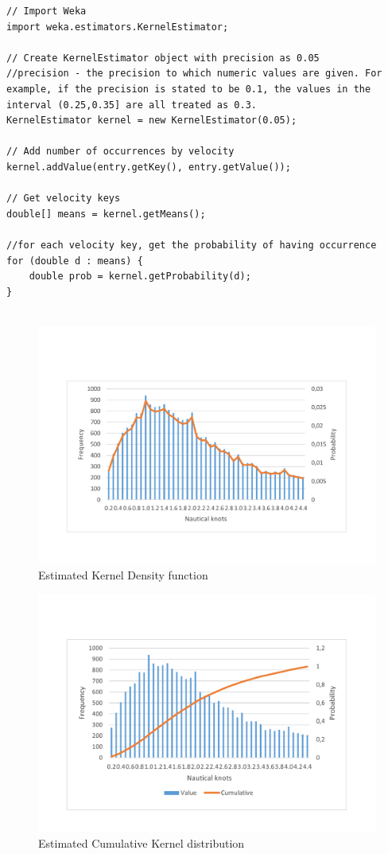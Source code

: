 \begin{enumerate}
\end{enumerate} 

\begin{lstlisting}
// Import Weka
import weka.estimators.KernelEstimator;

// Create KernelEstimator object with precision as 0.05
//precision - the precision to which numeric values are given. For example, if the precision is stated to be 0.1, the values in the interval (0.25,0.35] are all treated as 0.3.
KernelEstimator kernel = new KernelEstimator(0.05);

// Add number of occurrences by velocity
kernel.addValue(entry.getKey(), entry.getValue());

// Get velocity keys
double[] means = kernel.getMeans();

//for each velocity key, get the probability of having occurrence 
for (double d : means) {
 	double prob = kernel.getProbability(d);
}


\end{lstlisting}


\begin{figure}[H]
    \centering
    \includegraphics[trim=0 80 0 80,height=0.45\linewidth]{Chapters/img/hist_kernel.pdf}
    \caption{Estimated Kernel Density function}
    \label{fig:app_b_6}
\end{figure}


\begin{figure}[H]
    \centering
    \includegraphics[trim=0 80 0 80,height=0.45\linewidth]{Chapters/img/hist_comulative.pdf}
    \caption{Estimated Cumulative Kernel distribution}
    \label{fig:app_b_7}
\end{figure}


